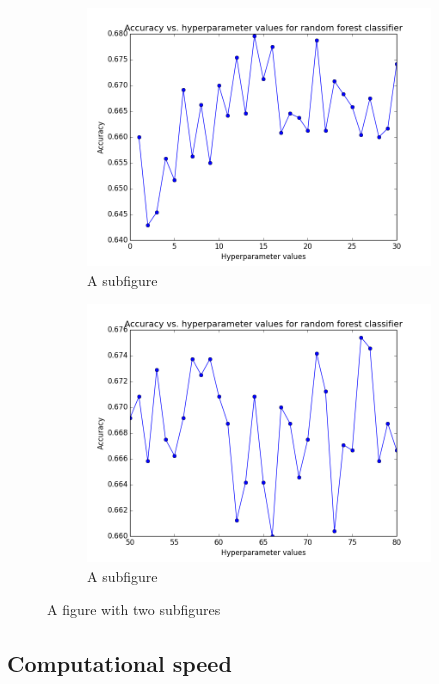 \documentclass{article} %
\begin{document}
\begin{figure}[H]
\centering
\begin{subfigure}{.4\textwidth}
  \centering
  \includegraphics[width=.9\linewidth]{hyperparameter_forest_1_30.png}
  \caption{A subfigure}
  \label{fig:sub1}
\end{subfigure}%
\begin{subfigure}{.4\textwidth}
  \centering
  \includegraphics[width=.9\linewidth]{hyperparameter_forest_50_81.png}
  \caption{A subfigure}
  \label{fig:sub2}
\end{subfigure}
\caption{A figure with two subfigures}
\label{fig:test}
\end{figure}



\subsection{Computational speed}
\end{document}
